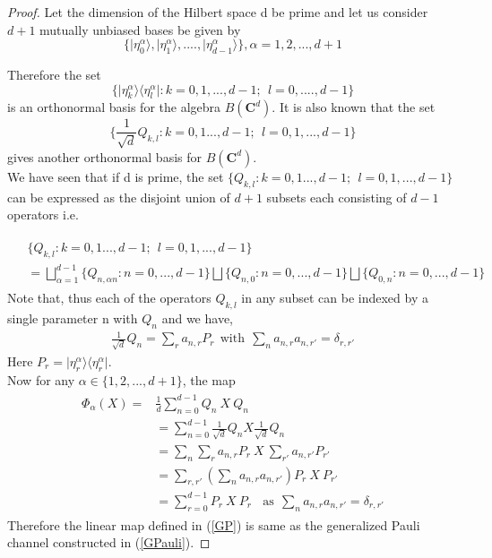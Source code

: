 \documentclass[12pt]{amsart}
\numberwithin{equation}{section}
\begin{document}
\begin{proof}
    Let the dimension of the Hilbert space d be prime and let us consider $d+1$ mutually unbiased bases be given by
    \[\lbrace \vert \eta_0^{\alpha} \rangle,\vert \eta_1^{\alpha} \rangle,....,\vert \eta_{d-1}^{\alpha} \rangle\rbrace , \alpha=1,2,...,d+1\]

    Therefore the set 
    \[\lbrace \vert \eta_k^{\alpha} \rangle\langle \eta_l^{\alpha} \vert : k=0,1,...,d-1 ;~~l=0,....,d-1 \rbrace\] is an orthonormal basis for the algebra $B\left(\mathbf{C}^d\right)$. It is also known that the set 
    \[\lbrace\frac{1}{\sqrt{d}}Q_{k,l}: k=0,1...,d-1; ~~l=0,1,...,d-1\rbrace\] gives another orthonormal basis for $B\left(\mathbf{C}^d\right)$.\\

    We have seen that if d is prime, the set $\lbrace Q_{k,l}: k=0,1...,d-1; ~~l=0,1,...,d-1\rbrace$ can be expressed as the disjoint union of $d+1$ subsets each consisting of $d-1$ operators i.e.

    \begin{eqnarray*}
    \begin{split}
   &\lbrace Q_{k,l}: k=0,1...,d-1; ~~l=0,1,...,d-1\rbrace\\
   &=\bigsqcup_{\alpha=1}^{d-1}  \lbrace Q_{n,\alpha n} :n=0,...,d-1 \rbrace \bigsqcup \lbrace Q_{n,0} :n=0,...,d-1\rbrace\bigsqcup \lbrace Q_{0,n} :n=0,...,d-1 \rbrace 
    \end{split}
    \end{eqnarray*}
Note that, thus each of the operators $Q_{k,l}$ in any subset can be indexed by a single parameter n with $Q_{n}$ and we have,
\begin{eqnarray*}
    \frac{1}{\sqrt{d}}Q_{n}=\sum_{r} a_{n,r} P_{r} ~~\text{with}~~\sum_{n} a_{n,r} a_{n,r'}=\delta_{r,r'}
\end{eqnarray*}
Here $P_{r}=\vert \eta_r^{\alpha} \rangle\langle \eta_r^{\alpha}\vert$.\\

    Now for any $\alpha \in \lbrace 1,2,...,d+1\rbrace$, the map
    \begin{eqnarray*}
        \begin{split}
            \Phi_{\alpha}(X)=&\frac{1}{d} \sum_{n=0}^{d-1} Q_{n}~ X~ Q_{n}\\
         &=\sum_{n=0}^{d-1} \frac{1}{\sqrt{d}}Q_{n} X \frac{1}{\sqrt{d}}Q_{n}\\
         &=\sum_{n} \sum_{r} a_{n,r} P_r ~X ~\sum_{r'} a_{n,r'} P_{r'}\\
         &=\sum_{r,r'} \left( \sum_{n} a_{n,r} a_{n,r'}\right) P_r ~X~P_{r'}\\
         &=\sum_{r=0}^{d-1} P_r~X~P_{r} ~~~~\text{as} ~~\sum_{n} a_{n,r} a_{n,r'}=\delta_{r,r'}
        \end{split}
    \end{eqnarray*}
    Therefore the linear map defined in (\ref{GP}) is same as the  generalized Pauli channel constructed in (\ref{GPauli}).
\end{proof}
\end{document}
